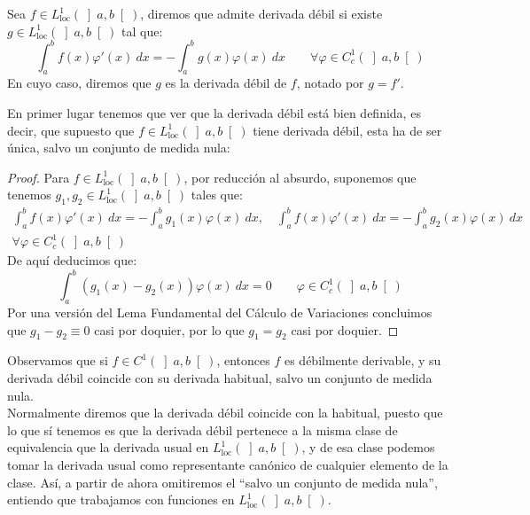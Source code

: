 \begin{definicion}
    Sea $f\in L^1_\text{loc}(\left]a,b\right[)$, diremos que admite derivada débil si existe $g\in L^1_\text{loc}(\left]a,b\right[)$ tal que:
    \begin{equation*}
        \int_{a}^{b} f(x)\varphi'(x)~dx  = -\int_{a}^{b} g(x)\varphi(x)~dx  \qquad \forall \varphi \in C_c^1(\left]a,b\right[)
    \end{equation*}
    En cuyo caso, diremos que $g$ es la derivada débil de $f$, notado por $g = f'$.
\end{definicion}

\noindent
En primer lugar tenemos que ver que la derivada débil está bien definida, es decir, que supuesto que $f\in L^1_\text{loc}(\left]a,b\right[)$ tiene derivada débil, esta ha de ser única, salvo un conjunto de medida nula:
\begin{proof}
    Para $f\in L^1_\text{loc}(\left]a,b\right[)$, por reducción al absurdo, suponemos que tenemos $g_1,g_2\in L^1_\text{loc}(\left]a,b\right[)$ tales que:
    \begin{multline*}
        \int_{a}^{b} f(x)\varphi'(x)~dx  = -\int_{a}^{b} g_1(x)\varphi(x)~dx, \quad 
        \int_{a}^{b} f(x)\varphi'(x)~dx  = -\int_{a}^{b} g_2(x)\varphi(x)~dx  \\ \forall \varphi \in C_c^1(\left]a,b\right[) 
    \end{multline*}
    De aquí deducimos que:
    \begin{equation*}
        \int_{a}^{b} (g_1(x)-g_2(x))\varphi(x)~dx = 0 \qquad \varphi \in C_c^1(\left]a,b\right[)
    \end{equation*}
    Por una versión del Lema Fundamental del Cálculo de Variaciones concluimos que $g_1-g_2\equiv 0$ casi por doquier, por lo que $g_1 = g_2$ casi por doquier.
\end{proof}

\begin{observacion}
    Observamos que si $f\in C^1(\left]a,b\right[)$, entonces $f$ es débilmente derivable, y su derivada débil coincide con su derivada habitual, salvo un conjunto de medida nula.\\

    \noindent
    Normalmente diremos que la derivada débil coincide con la habitual, puesto que lo que sí tenemos es que la derivada débil pertenece a la misma clase de equivalencia que la derivada usual en $L^1_\text{loc}(\left]a,b\right[)$, y de esa clase podemos tomar la derivada usual como representante canónico de cualquier elemento de la clase. Así, a partir de ahora omitiremos el ``salvo un conjunto de medida nula'', entiendo que trabajamos con funciones en $L^1_\text{loc}(\left]a,b\right[)$.
\end{observacion}

